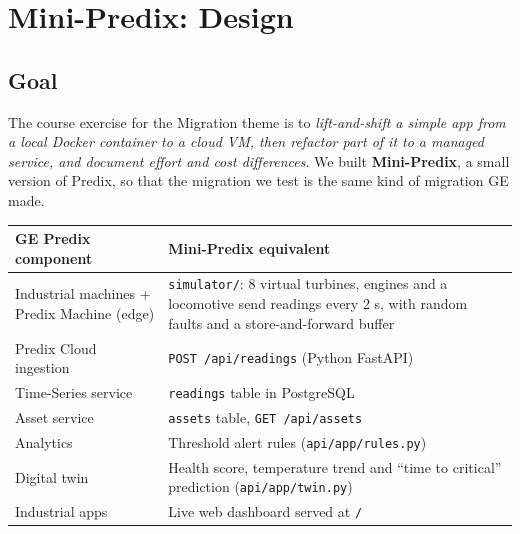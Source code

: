 \documentclass[12pt,a4paper]{article}
\begin{document}
\clearpage
\section{Mini-Predix: Design}
\subsection{Goal}
The course exercise for the Migration theme is to \emph{lift-and-shift a simple app from a local Docker
container to a cloud VM, then refactor part of it to a managed service, and document effort and cost
differences}. We built \textbf{Mini-Predix}, a small version of Predix, so that the migration we test is
the same kind of migration GE made.

\begin{center}
\begin{tabularx}{\linewidth}{@{}p{5.6cm}L@{}}
\toprule
\textbf{GE Predix component} & \textbf{Mini-Predix equivalent} \\
\midrule
Industrial machines + Predix Machine (edge) & \texttt{simulator/}: 8 virtual turbines, engines and a locomotive send readings every 2 s, with random faults and a store-and-forward buffer \\
Predix Cloud ingestion & \texttt{POST /api/readings} (Python FastAPI) \\
Time-Series service & \texttt{readings} table in PostgreSQL \\
Asset service & \texttt{assets} table, \texttt{GET /api/assets} \\
Analytics & Threshold alert rules (\texttt{api/app/rules.py}) \\
Digital twin & Health score, temperature trend and ``time to critical'' prediction (\texttt{api/app/twin.py}) \\
Industrial apps & Live web dashboard served at \texttt{/} \\
\bottomrule
\end{tabularx}
\end{center}
\end{document}
